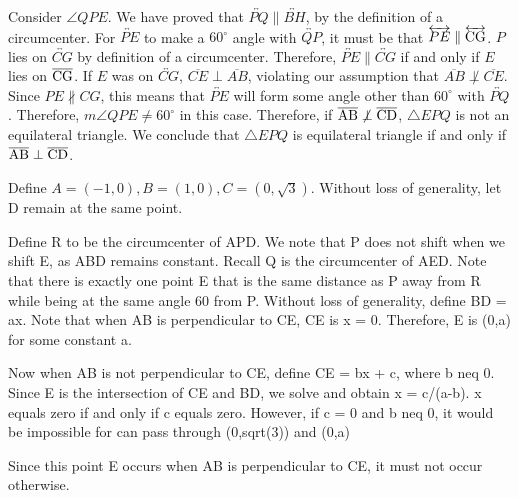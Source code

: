 \documentclass[11pt, letterpaper]{article}
\begin{document}
\begin{solution}{3}
Consider $\angle QPE$. We have proved that $\overleftrightarrow{PQ} \parallel \overleftrightarrow{BH}$, by the definition of a circumcenter. For $\overleftrightarrow{PE}$ to make a $60^\circ$ angle with $\overleftrightarrow{QP}$, it must be that $\overleftrightarrow{PE} \parallel \overleftrightarrow{\rm CG}$. $P$ lies on $\overleftrightarrow{CG}$ by definition of a circumcenter. Therefore, $\overleftrightarrow{PE} \parallel \overleftrightarrow{CG}$ if and only if $E$ lies on $\overline{\rm CG}$. If $E$ was on $\overleftrightarrow{CG}$, $\overline{CE} \perp \overline{AB}$, violating our assumption that $\overline{AB} \not\perp \overline{CE}$. Since $PE \not\parallel CG$, this means that $\overleftrightarrow{PE}$ will form some angle other than $60^\circ$ with $\overleftrightarrow{PQ}$. Therefore, $m\angle QPE \neq 60^\circ $ in this case. Therefore, if $\overline{\rm AB} \not\perp \overline{\rm CD}$, $\triangle EPQ$ is not an equilateral triangle. We conclude that $\triangle EPQ$ is equilateral triangle if and only if $\overline{\rm AB} \perp \overline{\rm CD}$.

\if
Define $A = (-1,0), B = (1,0), C = (0,\sqrt{3})$. Without loss of generality, let D remain at the same point. 

Define R to be the circumcenter of APD. We note that P does not shift when we shift E, as ABD remains constant. Recall Q is the circumcenter of AED. 
Note that there is exactly one point E that is the same distance as P away from R while being at the same angle 60 from P. Without loss of generality, define BD = ax. Note that when AB is perpendicular to CE,  CE is x = 0. Therefore, E is (0,a) for some constant a. 

Now when AB is not perpendicular to CE, define CE = bx + c, where b neq 0. Since E is the intersection of CE and BD, we solve and obtain x = c/(a-b). x equals zero if and only if c equals zero. However, if c = 0 and b neq 0, it would be impossible for  can pass through (0,sqrt(3)) and (0,a)

Since this point E occurs when AB is perpendicular to CE, it must not occur otherwise. 
\fi
\end{solution}
\end{document}
